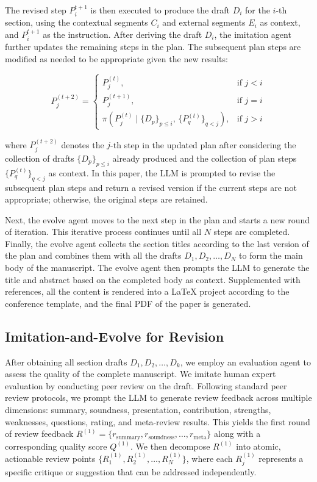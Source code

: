 \documentclass[manuscript,review,anonymous]{acmart}
\begin{document}
The revised step $P_i^{t+1}$ is then executed to produce the draft $D_i$ for the $i$-th section, using the contextual segments $C_i$ and external segments $E_i$ as context, and $P_i^{t+1}$ as the instruction. After deriving the draft $D_i$, the imitation agent further updates the remaining steps in the plan. The subsequent plan steps are modified as needed to be appropriate given the new results:

\begin{equation}
P_j^{(t+2)} = 
\begin{cases}
P_j^{(t)}, & \text{if } j < i \\
P_j^{(t+1)}, & \text{if } j = i \\
\pi\left(P_j^{(t)} \mid \{D_p\}_{p \leq i},\, \{P_q^{(t)}\}_{q < j}\right), & \text{if } j > i
\end{cases}
\end{equation}

where $P_j^{(t+2)}$ denotes the $j$-th step in the updated plan after considering the collection of drafts $\{D_p\}_{p \leq i}$ already produced and the collection of plan steps $\{P_q^{(t)}\}_{q < j}$ as context. In this paper, the LLM is prompted to revise the subsequent plan steps and return a revised version if the current steps are not appropriate; otherwise, the original steps are retained.

Next, the evolve agent moves to the next step in the plan and starts a new round of iteration. This iterative process continues until all $N$ steps are completed. Finally, the evolve agent collects the section titles according to the last version of the plan and combines them with all the drafts ${D_1, D_2, \ldots, D_N}$ to form the main body of the manuscript. The evolve agent then prompts the LLM to generate the title and abstract based on the completed body as context. Supplemented with references, all the content is rendered into a LaTeX project according to the conference template, and the final PDF of the paper is generated.

\subsection{Imitation-and-Evolve for Revision}

After obtaining all section drafts $D_1, D_2, \ldots, D_k$, we employ an evaluation agent to assess the quality of the complete manuscript. We imitate human expert evaluation by conducting peer review on the draft. Following standard peer review protocols, we prompt the LLM to generate review feedback across multiple dimensions: summary, soundness, presentation, contribution, strengths, weaknesses, questions, rating, and meta-review results. This yields the first round of review feedback $R^{(1)} = \{r_{\text{summary}}, r_{\text{soundness}}, \ldots, r_{\text{meta}}\}$ along with a corresponding quality score $Q^{(1)}$. We then decompose $R^{(1)}$ into atomic, actionable review points $\{R_1^{(1)}, R_2^{(1)}, \ldots, R_N^{(1)}\}$, where each $R_j^{(1)}$ represents a specific critique or suggestion that can be addressed independently.
\end{document}
